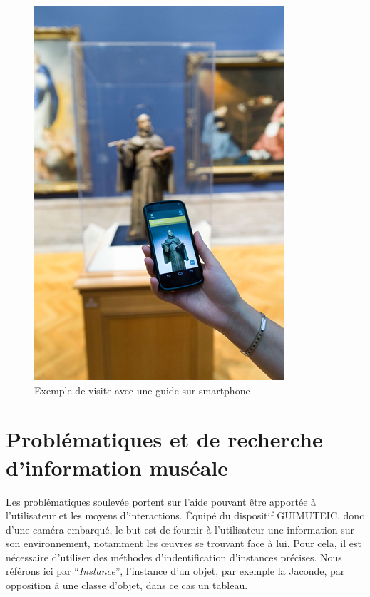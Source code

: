 \begin{figure}%
\centering
\includegraphics[width=\columnwidth/2]{figures/ArtLens.jpg}%
\caption{Exemple de visite avec une guide sur smartphone}%
\label{fig:exemplevisite}%
\end{figure}



\section{Problématiques et de recherche d'information muséale}
\label{sec:introcontraintes}
Les problématiques soulevée portent sur l'aide pouvant être apportée à l'utilisateur et les moyens d'interactions.
Équipé du dispositif GUIMUTEIC, donc d'une caméra embarqué, le but est de fournir à l'utilisateur une information sur son environnement, notamment les œuvres se trouvant face à lui.
Pour cela, il est nécessaire d'utiliser des méthodes d'indentification d'instances précises.
Nous référons ici par ``{\it Instance}'', l'instance d'un objet, par exemple la Jaconde, par opposition à une classe d'objet, dans ce cas un tableau. 

